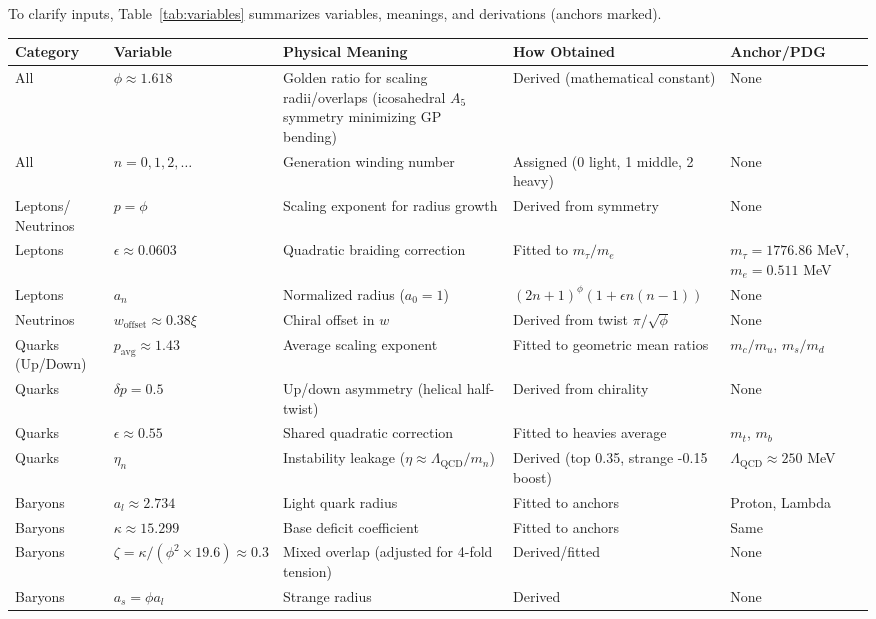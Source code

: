 \documentclass{article}
\begin{document}
To clarify inputs, Table~\ref{tab:variables} summarizes variables, meanings, and derivations (anchors marked).

\begin{sidewaystable}[p]
\centering
\begin{tabular}{|p{2cm}|p{3cm}|p{6cm}|p{6cm}|p{3cm}|}
\hline
Category & Variable & Physical Meaning & How Obtained & Anchor/PDG \\
\hline
All & $\phi \approx 1.618$ & Golden ratio for scaling radii/overlaps (icosahedral $A_5$ symmetry minimizing GP bending) & Derived (mathematical constant) & None \\
All & $n = 0,1,2,\dots$ & Generation winding number & Assigned (0 light, 1 middle, 2 heavy) & None \\
Leptons/ Neutrinos & $p = \phi$ & Scaling exponent for radius growth & Derived from symmetry & None \\
Leptons & $\epsilon \approx 0.0603$ & Quadratic braiding correction & Fitted to $m_\tau / m_e$ & $m_\tau=1776.86$ MeV, $m_e=0.511$ MeV \\
Leptons & $a_n$ & Normalized radius ($a_0=1$) & $(2n+1)^\phi (1 + \epsilon n(n-1))$ & None \\
Neutrinos & $w_{\text{offset}} \approx 0.38 \xi$ & Chiral offset in $w$ & Derived from twist $\pi / \sqrt{\phi}$ & None \\
Quarks (Up/Down) & $p_{\text{avg}} \approx 1.43$ & Average scaling exponent & Fitted to geometric mean ratios & $m_c/m_u$, $m_s/m_d$ \\
Quarks & $\delta p = 0.5$ & Up/down asymmetry (helical half-twist) & Derived from chirality & None \\
Quarks & $\epsilon \approx 0.55$ & Shared quadratic correction & Fitted to heavies average & $m_t$, $m_b$ \\
Quarks & $\eta_n$ & Instability leakage ($\eta \approx \Lambda_{\text{QCD}} / m_n$) & Derived (top 0.35, strange -0.15 boost) & $\Lambda_{\text{QCD}} \approx 250$ MeV \\
Baryons & $a_l \approx 2.734$ & Light quark radius & Fitted to anchors & Proton, Lambda \\
Baryons & $\kappa \approx 15.299$ & Base deficit coefficient & Fitted to anchors & Same \\
Baryons & $\zeta = \kappa / (\phi^2 \times 19.6) \approx 0.3$ & Mixed overlap (adjusted for 4-fold tension) & Derived/fitted & None \\
Baryons & $a_s = \phi a_l$ & Strange radius & Derived & None \\

\end{tabular}
\end{sidewaystable}
\end{document}
